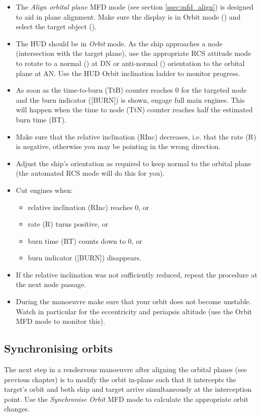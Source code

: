 \documentclass[Orbiter User Manual.tex]{subfiles}
\begin{document}
\begin{itemize}
	\item The \emph{Align orbital plane} MFD mode (see section
		\ref{ssec:mfd_align}) is designed to aid in plane alignment. Make sure
		the display is in Orbit mode () and select the target object
		().
	\item The HUD should be in \emph{Orbit} mode. As the ship approaches a node
		(intersection with the target plane), use the appropriate RCS attitude
		mode to rotate to a normal (\keystroke{;}) at DN or anti-normal
		() orientation to the orbital plane at AN. Use the HUD
		Orbit inclination ladder to monitor progress.
	\item As soon as the time-to-burn (TtB) counter reaches 0 for the targeted
		node and the burn indicator ([BURN]) is shown, engage full main engines.
		This will happen when the time to node (TtN) counter reaches half the
		estimated burn time (BT).
	\item Make sure that the relative inclination (RInc) decreases, i.e. that
		the rate (R) is negative, otherwise you may be pointing in the wrong
		direction.
	\item Adjust the ship's orientation as required to keep normal to the
		orbital plane (the automated RCS mode will do this for you).
	\item Cut engines when:
	\begin{itemize}
		\item relative inclination (RInc) reaches 0, or
		\item rate (R) turns positive, or
		\item burn time (BT) counts down to 0, or
		\item burn indicator ([BURN]) disappears.
	\end{itemize}
	\item If the relative inclination was not sufficiently reduced, repeat the
		procedure at the next node passage.
	\item During the manoeuvre make sure that your orbit does not become
		unstable. Watch in particular for the eccentricity and periapsis
		altitude (use the Orbit MFD mode to monitor this).
\end{itemize}


\subsection{Synchronising orbits}
\label{ssec:basic_sync}
The next step in a rendezvous manoeuvre after aligning the orbital planes (see
previous chapter) is to modify the orbit in-plane such that it intercepts the
target's orbit and both ship and target arrive simultaneously at the
interception point. Use the \emph{Synchronise Orbit} MFD mode to calculate the
appropriate orbit changes.
\end{document}

